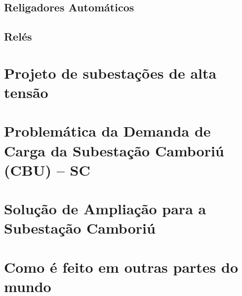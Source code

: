 \documentclass[a5paper,english,spanish,brazil]{ufsc-thesis}
\begin{document}
	\section{Religadores Automáticos}

	\section{Relés}



\chapter{Projeto de subestações de alta tensão}
\label{chap:projSEAT}
	\begin{mdframed}[hidealllines=true,backgroundcolor=blue!20]
	\lipsum
	\end{mdframed}


\chapter{Problemática da Demanda de Carga da Subestação Camboriú (CBU) -- SC}
\label{chap:demCarga}
	\begin{mdframed}[hidealllines=true,backgroundcolor=blue!20]
	\lipsum
	\end{mdframed}


\chapter{Solução de Ampliação para a Subestação Camboriú}
\label{chap:solAmp}
	\begin{mdframed}[hidealllines=true,backgroundcolor=blue!20]
	\lipsum
	\end{mdframed}


\chapter{Como é feito em outras partes do mundo}
\label{chap:asbuiltAbroad}
	\begin{mdframed}[hidealllines=true,backgroundcolor=blue!20]
	\lipsum
	\end{mdframed}
\end{document}
